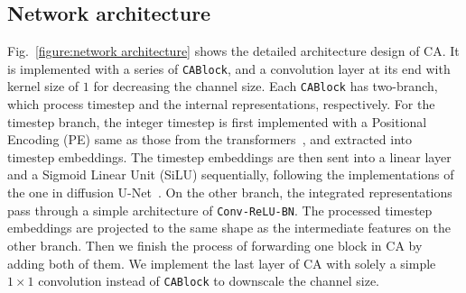 \documentclass{article}
\begin{document}
\subsection{Network architecture}


Fig.~\ref{figure:network architecture} shows the detailed architecture design of CA. It is implemented with a series of \texttt{CABlock}, and a convolution layer at its end with kernel size of $1$ for decreasing the channel size. Each \texttt{CABlock} has two-branch, which process timestep and the internal representations, respectively. For the timestep branch, the integer timestep is first implemented with a Positional Encoding (PE) same as those from the transformers~\cite{NIPS2017_3f5ee243}, and extracted into timestep embeddings. The timestep embeddings are then sent into a linear layer and a Sigmoid Linear Unit (SiLU) sequentially, following the implementations of the one in diffusion U-Net~\cite{rombach2022high}. On the other branch, the integrated representations pass through a simple architecture of \texttt{Conv-ReLU-BN}. The processed timestep embeddings are projected to the same shape as the intermediate features on the other branch. Then we finish the process of forwarding one block in CA by adding both of them. We implement the last layer of CA with solely a simple $1 \times 1$ convolution instead of \texttt{CABlock} to downscale the channel size.
\end{document}
